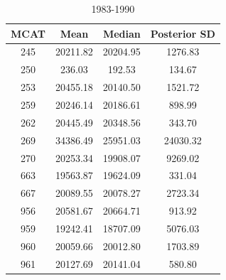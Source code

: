 \documentclass[12pt]{article}
\begin{document}
%
\begin{table}[h!]
\centering
\begin{tabular}{|c|c|c|c|}
\hline
MCAT & Mean & Median & Posterior SD     \\ \hline
245 & 20211.82 & 20204.95 & 1276.83     \\
250 & 236.03   & 192.53   & 134.67      \\
253 & 20455.18 & 20140.50 & 1521.72     \\
259 & 20246.14 & 20186.61 & 898.99      \\
262 & 20445.49 & 20348.56 & 343.70      \\
269 & 34386.49 & 25951.03 & 24030.32    \\
270 & 20253.34 & 19908.07 & 9269.02     \\
663 & 19563.87 & 19624.09 & 331.04      \\
667 & 20089.55 & 20078.27 & 2723.34     \\
956 & 20581.67 & 20664.71 & 913.92      \\
959 & 19242.41 & 18707.09 & 5076.03     \\
960 & 20059.66 & 20012.80 & 1703.89     \\
961 & 20127.69 & 20141.04 & 580.80      \\
\hline
\end{tabular}
\caption{1983-1990}
\label{v83}
\end{table}

%
\clearpage
\singlespacing
%
\end{document}
